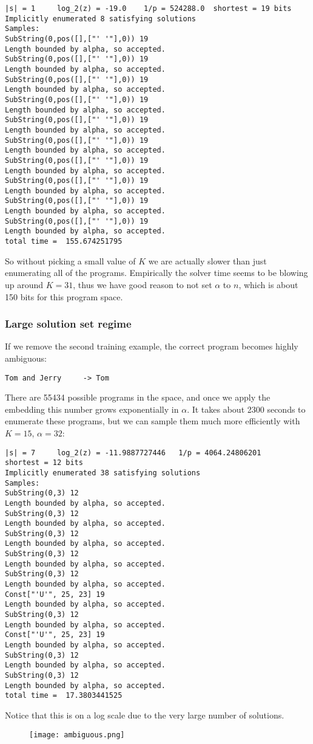 \documentclass{article}
\begin{document}
\begin{verbatim}
|s| = 1 	log_2(z) = -19.0 	1/p = 524288.0 	shortest = 19 bits
Implicitly enumerated 8 satisfying solutions
Samples:
SubString(0,pos([],["' '"],0)) 19
Length bounded by alpha, so accepted.
SubString(0,pos([],["' '"],0)) 19
Length bounded by alpha, so accepted.
SubString(0,pos([],["' '"],0)) 19
Length bounded by alpha, so accepted.
SubString(0,pos([],["' '"],0)) 19
Length bounded by alpha, so accepted.
SubString(0,pos([],["' '"],0)) 19
Length bounded by alpha, so accepted.
SubString(0,pos([],["' '"],0)) 19
Length bounded by alpha, so accepted.
SubString(0,pos([],["' '"],0)) 19
Length bounded by alpha, so accepted.
SubString(0,pos([],["' '"],0)) 19
Length bounded by alpha, so accepted.
SubString(0,pos([],["' '"],0)) 19
Length bounded by alpha, so accepted.
SubString(0,pos([],["' '"],0)) 19
Length bounded by alpha, so accepted.
total time =  155.674251795
\end{verbatim}
So without picking a small value of $K$ we are actually slower than just enumerating all of the programs.
Empirically the solver time seems to be blowing up around $K = 31$,
thus we have good reason to not set $\alpha$ to $n$, which is about 150 bits for this program space.

\subsubsection{Large solution set regime}
If we remove the second training example, the correct program becomes highly ambiguous:
\begin{verbatim}
Tom and Jerry     -> Tom
\end{verbatim}
There are 55434 possible programs in the space, and once we apply the embedding this number grows exponentially in $\alpha$.
It takes about 2300 seconds to enumerate these programs, but we can sample them much more efficiently with $K=15$, $\alpha = 32$:
\begin{verbatim}
|s| = 7 	log_2(z) = -11.9887727446 	1/p = 4064.24806201 	shortest = 12 bits
Implicitly enumerated 38 satisfying solutions
Samples:
SubString(0,3) 12
Length bounded by alpha, so accepted.
SubString(0,3) 12
Length bounded by alpha, so accepted.
SubString(0,3) 12
Length bounded by alpha, so accepted.
SubString(0,3) 12
Length bounded by alpha, so accepted.
SubString(0,3) 12
Length bounded by alpha, so accepted.
Const["'U'", 25, 23] 19
Length bounded by alpha, so accepted.
SubString(0,3) 12
Length bounded by alpha, so accepted.
Const["'U'", 25, 23] 19
Length bounded by alpha, so accepted.
SubString(0,3) 12
Length bounded by alpha, so accepted.
SubString(0,3) 12
Length bounded by alpha, so accepted.
total time =  17.3803441525
\end{verbatim}
Notice that this is on a log scale due to the very large number of solutions.
\begin{figure}
  \texttt{[image: ambiguous.png]}  
\end{figure}
\end{document}
